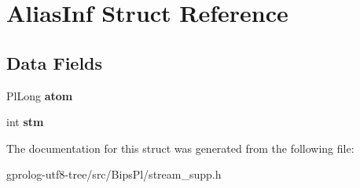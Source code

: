 \hypertarget{structAliasInf}{}\section{Alias\+Inf Struct Reference}
\label{structAliasInf}
\subsection*{Data Fields}
\begin{DoxyCompactItemize}
\item 
Pl\+Long {\bfseries atom}\hypertarget{structAliasInf_aa0eddd23c6a16d2a76eecc569dbd34d1}{}\label{structAliasInf_aa0eddd23c6a16d2a76eecc569dbd34d1}

\item 
int {\bfseries stm}\hypertarget{structAliasInf_aff64cf68f3f548a6978aa01f8509cc9c}{}\label{structAliasInf_aff64cf68f3f548a6978aa01f8509cc9c}

\end{DoxyCompactItemize}


The documentation for this struct was generated from the following file\+:\begin{DoxyCompactItemize}
\item 
gprolog-\/utf8-\/tree/src/\+Bips\+Pl/stream\+\_\+supp.\+h\end{DoxyCompactItemize}
